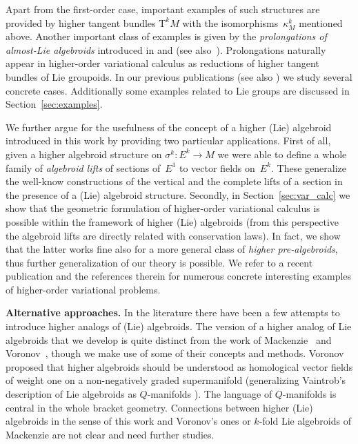 \documentclass[pdftex]{sigma}
\newcommand{\ra}{\rightarrow}
\newcommand{\prealg}{pre-algebroid} %
\newcommand{\TT}[1]{\mathrm{T}^{#1}} %
\numberwithin{equation}{section}
\theoremstyle{definition}
\begin{document}
 Apart from the first-order case, important examples of such structures are provided by higher tangent bundles $\TT{k} M$ with the isomorphisms~$\kappa^k_M$ mentioned above. Another important class of examples is given by the \emph{prolongations of almost-Lie algebroids} introduced in \cite{Col_deDiego_seminar_2011} and \cite{MJ_MR_models_high_alg_2015} (see also~\cite{Saunders_2004}). Prolongations naturally appear in higher-order variational calculus as reductions of higher tangent bundles of Lie groupoids. In our previous publications \cite{MJ_MR_prototypes,MJ_MR_models_high_alg_2015} (see also \cite{Martinez_2015}) we study several concrete cases. Additionally some examples related to Lie groups are discussed in Section~\ref{sec:examples}.

We further argue for the usefulness of the concept of a higher (Lie) algebroid introduced in this work by providing two particular applications. First of all, given a higher algebroid structure on $\sigma^k\colon E^k\ra M$ we were able to define a whole family of \emph{algebroid lifts} of sections of~$E^1$ to vector fields on~$E^k$. These generalize the well-know constructions of the vertical and the complete lifts of a section in the presence of a (Lie) algebroid structure. Secondly, in Section~\ref{sec:var_calc} we show that the geometric formulation of higher-order variational calculus is possible within the framework of higher (Lie) algebroids (from this perspective the algebroid lifts are directly related with conservation laws). In fact, we show that the latter works fine also for a more general class of \emph{higher \prealg s}, thus further generalization of our theory is possible. We refer to a recent publication \cite{Colombo_2017} and the references therein for numerous concrete interesting examples of higher-order variational problems.

{\bf Alternative approaches.} In the literature there have been a few attempts to introduce higher analogs of (Lie) algebroids. The version of a higher analog of Lie algebroids that we develop is quite distinct from the work of Mackenzie~\cite{Mackenzie_2011} and Voronov~\cite{Voronov_Q_mfds_high_lie_alg_2010, Voronov_2012}, though we make use of some of their concepts and methods. Voronov \cite{Voronov_Q_mfds_high_lie_alg_2010} proposed that higher algebroids should be understood as homological vector fields of weight one on a non-negatively graded supermanifold (generalizing Vaintrob's description of Lie algebroids as $Q$-manifolds \cite{Vaintrob_1997}). The language of $Q$-manifolds is central in the whole bracket geometry. Connections between higher (Lie) algebroids in the sense of this work and Voronov's ones or $k$-fold Lie algebroids of Mackenzie are not clear and need further studies.
\end{document}
